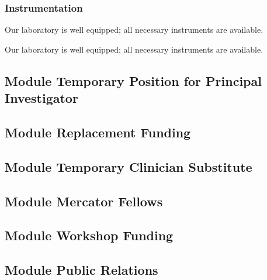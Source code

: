 \documentclass{scrartcl}
\begin{document}
\subsubsection{Instrumentation}

Our laboratory is well equipped; all necessary instruments are available.

Our laboratory is well equipped; all necessary instruments are available.



\vspace*{2cm}

\subsection{Module Temporary Position for Principal Investigator}

\subsection{Module Replacement Funding}

\subsection{Module Temporary Clinician Substitute}

\subsection{Module Mercator Fellows}

\subsection{Module Workshop Funding}

\subsection{Module Public Relations}
\end{document}
